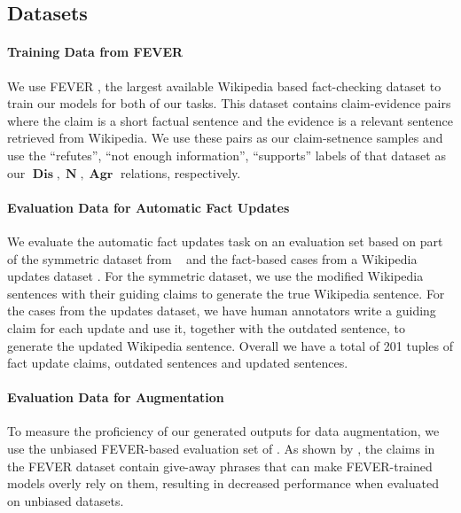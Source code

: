\documentclass[letterpaper]{article} %
\DeclareMathOperator{\A}{\boldsymbol{Agr}}
\DeclareMathOperator{\D}{\boldsymbol{Dis}}
\DeclareMathOperator{\N}{\boldsymbol{N}}
\begin{document}
\subsection{Datasets}


\paragraph{Training Data from FEVER}
We use FEVER \cite{fever}, the largest available Wikipedia based fact-checking dataset to train our models for both of our tasks. This dataset contains claim-evidence pairs where the claim is a short factual sentence and the evidence is a relevant sentence retrieved from Wikipedia.
We use these pairs as our claim-setnence samples and use the ``refutes'', ``not enough information'', ``supports'' labels of that dataset as our $\D, \N, \A$ relations, respectively.



\paragraph{Evaluation Data for Automatic Fact Updates}
We evaluate the automatic fact updates task on an evaluation set based on part of the symmetric dataset from ~\cite{schuster2019towards} and the fact-based cases from a Wikipedia updates dataset \cite{yang-etal-2017-identifying-semantic}. For the symmetric dataset, we use the modified Wikipedia sentences with their guiding claims to generate the true Wikipedia sentence. For the cases from the updates dataset, we have human annotators write a guiding claim for each update and use it, together with the outdated sentence, to generate the updated Wikipedia sentence.
Overall we have a total of 201 tuples of fact update claims, outdated sentences and updated sentences.






\paragraph{Evaluation Data for Augmentation}


To measure the proficiency of our generated outputs for data augmentation, we use the unbiased FEVER-based evaluation set of \cite{schuster2019towards}.
As shown by \cite{schuster2019towards}, the claims in the FEVER dataset contain give-away phrases that can make FEVER-trained models overly rely on them, resulting in decreased performance when evaluated on unbiased datasets.
\end{document}

